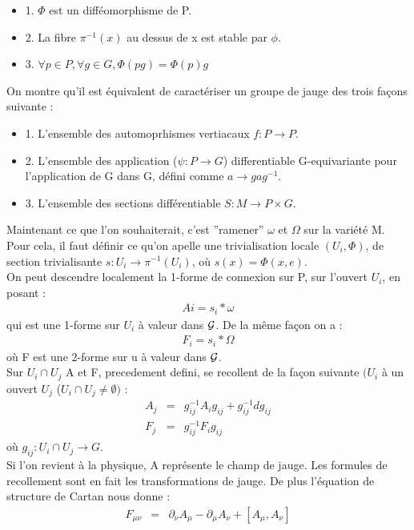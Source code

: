 \documentclass[a4paper,11pt]{article} %
\theoremstyle{plain}
\theoremstyle{definition}
\theoremstyle{remark}
\numberwithin{equation}{section}
\numberwithin{equation}{subsection}
\numberwithin{figure}{section}
\begin{document}
\begin{itemize}
 \renewcommand{\labelitemi}{$\bullet$}
 \item 1. $\Phi$ est un difféomorphisme de P.
 \item 2. La fibre $\pi^{-1} (x)$ au dessus de x est stable par $\phi$.
 \item 3. $\forall p \in P, \forall g \in G , \Phi (pg) = \Phi(p) g$
\end{itemize}
On montre qu'il est équivalent de caractériser un groupe de jauge des trois façons suivante :
\begin{itemize}
 \renewcommand{\labelitemi}{$\bullet$}
 \item 1. L'ensemble des automoprhismes vertiacaux $ f: P \to P$.
 \item 2. L'ensemble des application ($\psi : P \to G$) differentiable G-equivariante pour l'application de G dans G, défini comme $a \to g a g^{-1}$.
 \item 3. L'ensemble des sections différentiable $S : M \to P \times G$.
\end{itemize}

\noindent
Maintenant ce que l'on souhaiterait, c'est ''ramener'' $\omega$ et $\Omega$ sur la variété M. Pour cela, il faut définir ce qu'on apelle une trivialisation locale $(U_{i}, \Phi)$, de section trivialisante $s: U_{i} \rightarrow \pi^{-1} (U_{i})$, où $s(x) = \Phi (x,e)$. \\
On peut descendre localement la 1-forme de connexion sur P, sur l'ouvert $U_{i}$, en posant :
\begin{eqnarray*}
 A{i} = s_{i}*\omega
\end{eqnarray*}
qui est une 1-forme sur $U_{i}$ à valeur dans $\cal{G}$. De la même façon on a :
\begin{eqnarray*}
 F_{i} = s_{i}*\Omega
\end{eqnarray*}
où F est une 2-forme sur u à valeur dans $\cal{G}$. \\
Sur $U_{i} \cap U_{j}$ A et F, precedement defini, se recollent de la façon suivante $(U_{i}$ à un ouvert $U_{j}$ ($U_{i} \cap U_{j} \ne \emptyset )$ :
\begin{eqnarray*}
 A_{j} &=& g^{-1}_{ij} A_{i} g_{ij} + g^{-1}_{ij} d g_{ij} \\
 F_{j} &=& g^{-1}_{ij} F_{i} g_{ij} 
\end{eqnarray*}
où $g_{ij} : U_{i} \cap U_{j}  \to  G$.\\
Si l'on revient à la physique, A représente le champ de jauge. Les formules de recollement sont en fait les transformations de jauge. De plus l'équation de structure de Cartan nous donne :
\begin{eqnarray*}
 F_{\mu \nu} &=&  \partial_{\nu}A_{\mu} - \partial_{\mu}A_{\nu} + [A_{\mu},A_{\nu}]
\end{eqnarray*}
\end{document}
